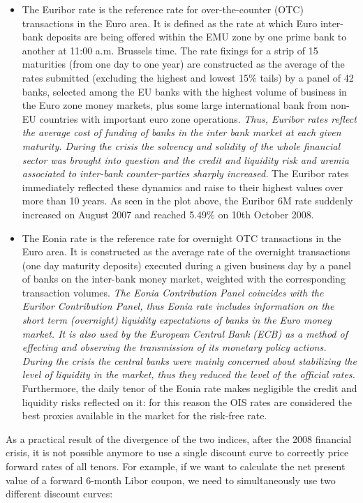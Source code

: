 \begin{itemize}
\tightlist
\item
  The Euribor rate is the reference rate for over-the-counter (OTC)
  transactions in the Euro area. It is defined as the rate at which
  Euro inter-bank deposits are being offered within the EMU zone by one
  prime bank to another at 11:00 a.m. Brussels time. The rate fixings
  for a strip of 15 maturities (from one day to one year) are
  constructed as the average of the rates submitted (excluding the
  highest and lowest 15\% tails) by a panel of 42 banks, selected
  among the EU banks with the highest volume of business in the Euro
  zone money markets, plus some large international bank from non-EU
  countries with important euro zone operations. \emph{Thus, Euribor
  rates reflect the average cost of funding of banks in the inter bank
  market at each given maturity. During the crisis the solvency and
  solidity of the whole financial sector was brought into question and
  the credit and liquidity risk and uremia associated to inter-bank
  counter-parties sharply increased.} The Euribor rates immediately
  reflected these dynamics and raise to their highest values over more
  than 10 years. As seen in the plot above, the Euribor 6M rate suddenly
  increased on August 2007 and reached 5.49\% on 10th October 2008.
\item
  The Eonia rate is the reference rate for overnight OTC transactions in
  the Euro area. It is constructed as the average rate of the overnight
  transactions (one day maturity deposits) executed during a given
  business day by a panel of banks on the inter-bank money market,
  weighted with the corresponding transaction volumes. \emph{The Eonia
  Contribution Panel coincides with the Euribor Contribution Panel, thus
  Eonia rate includes information on the short term (overnight)
  liquidity expectations of banks in the Euro money market. It is also
  used by the European Central Bank (ECB) as a method of effecting and
  observing the transmission of its monetary policy actions. During the
  crisis the central banks were mainly concerned about stabilizing the
  level of liquidity in the market, thus they reduced the level of the
  official rates.} Furthermore, the daily tenor of the Eonia rate makes
  negligible the credit and liquidity risks reflected on it: for this
  reason the OIS rates are considered the best proxies available in the
  market for the risk-free rate.
\end{itemize}

As a practical result of the divergence of the two indices, after the 2008 financial crisis, it is not possible anymore to use a single discount curve to correctly price forward rates of all tenors. For example, if we want to calculate the net present value of a forward 6-month Libor coupon, we need to simultaneously use two different discount curves:

